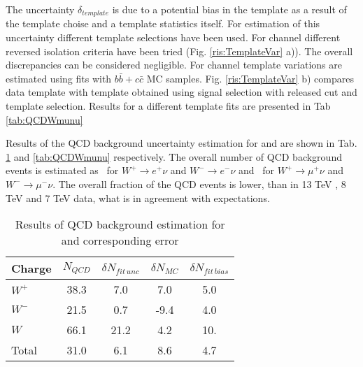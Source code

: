 The uncertainty $\delta_{template}$ is due to a potential bias in the template as a result of the template choise and a template statistics itself. For estimation of this uncertainty different template selections have been used. For \wenu channel different reversed isolation criteria have been tried (Fig. \ref{ris:TemplateVar} a)). The overall discrepancies can be considered negligible. For \wmunu channel template variations are estimated using fits with $b\bar{b}+c\bar{c}$ MC samples.  Fig. \ref{ris:TemplateVar} b) compares data template with template obtained using signal selection with released \mtw cut and template selection. Results for a different template fits are presented in Tab \ref{tab:QCDWmunu}



Results of the QCD background uncertainty estimation for \wenu and \wmunu are shown in Tab. \ref{tab:QCDWenu} and \ref{tab:QCDWmunu} respectively. The overall number of QCD background events is estimated as \nQCDWplusenu\,  for $W^{+}\to e^{+}\nu$ and $W^{-}\to e^{-}\nu$ and \nQCDWplusmunu\,   for $W^{+}\to \mu^{+}\nu$ and $W^{-}\to \mu^{-}\nu$. The overall fraction of the QCD events is lower, than in 13 TeV \cite{a13TeV}, 8 TeV \cite{a8TeV} and 7 TeV \cite{a7TeV} data, what is in agreement with expectations.

\begin{table}[!tbp]
    \caption{Results of QCD background estimation for \wenu and corresponding error}
	\label{tab:QCDWenu}
	\begin{center}
		\begin{tabular}{l | c | c | c | c }
		\hline
		    Charge & $N_{QCD}$ & $ \delta N_{fit\, unc} $ & $\delta N_{MC}$ & $\delta N_{fit\, bias}$ \\
		    \hline
		    $W^{+}$ & 38.3 & 7.0 & 7.0 & 5.0 \\
		    $W^{-} $ & 21.5 & 0.7 &  -9.4 & 4.0 \\
		    $W$ & 66.1 & 21.2 & 4.2 & 10.  \\
		    \hline
		    \hline
		    Total & 31.0 & 6.1 & 8.6 & 4.7 \\
		    \hline
		\end{tabular}
	\end{center}
\end{table}

